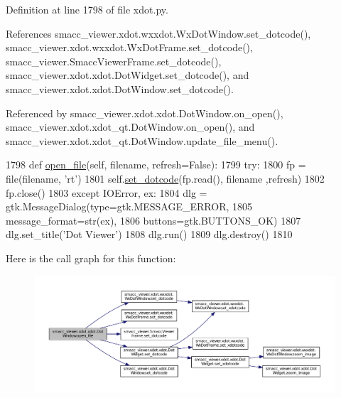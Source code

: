 Definition at line 1798 of file xdot.\+py.



References smacc\+\_\+viewer.\+xdot.\+wxxdot.\+Wx\+Dot\+Window.\+set\+\_\+dotcode(), smacc\+\_\+viewer.\+xdot.\+wxxdot.\+Wx\+Dot\+Frame.\+set\+\_\+dotcode(), smacc\+\_\+viewer.\+Smacc\+Viewer\+Frame.\+set\+\_\+dotcode(), smacc\+\_\+viewer.\+xdot.\+xdot.\+Dot\+Widget.\+set\+\_\+dotcode(), and smacc\+\_\+viewer.\+xdot.\+xdot.\+Dot\+Window.\+set\+\_\+dotcode().



Referenced by smacc\+\_\+viewer.\+xdot.\+xdot.\+Dot\+Window.\+on\+\_\+open(), smacc\+\_\+viewer.\+xdot.\+xdot\+\_\+qt.\+Dot\+Window.\+on\+\_\+open(), and smacc\+\_\+viewer.\+xdot.\+xdot\+\_\+qt.\+Dot\+Window.\+update\+\_\+file\+\_\+menu().


\begin{DoxyCode}
1798     \textcolor{keyword}{def }\hyperlink{classsmacc__viewer_1_1xdot_1_1xdot_1_1DotWindow_a1fd99c9d7a38dff168054383a435f00a}{open\_file}(self, filename, refresh=False):
1799         \textcolor{keywordflow}{try}:
1800             fp = file(filename, \textcolor{stringliteral}{'rt'})
1801             self.\hyperlink{classsmacc__viewer_1_1xdot_1_1xdot_1_1DotWindow_a0628cbc37723198ff1bab7cbd3c70ad3}{set\_dotcode}(fp.read(), filename ,refresh)
1802             fp.close()
1803         \textcolor{keywordflow}{except} IOError, ex:
1804             dlg = gtk.MessageDialog(type=gtk.MESSAGE\_ERROR,
1805                                     message\_format=str(ex),
1806                                     buttons=gtk.BUTTONS\_OK)
1807             dlg.set\_title(\textcolor{stringliteral}{'Dot Viewer'})
1808             dlg.run()
1809             dlg.destroy()
1810 
\end{DoxyCode}


Here is the call graph for this function\+:
\nopagebreak
\begin{figure}[H]
\begin{center}
\leavevmode
\includegraphics[width=350pt]{classsmacc__viewer_1_1xdot_1_1xdot_1_1DotWindow_a1fd99c9d7a38dff168054383a435f00a_cgraph}
\end{center}
\end{figure}




